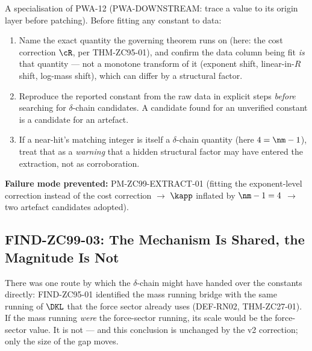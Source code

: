 \documentclass[12pt, a4paper]{article}
\begin{document}
\begin{formalbox}[title={PWA-14 (NEW): Verify the Quantity-Identity Before
  Extracting a Constant}]
A specialisation of PWA-12 (PWA-DOWNSTREAM: trace a value to its origin layer
before patching). Before fitting any constant to data:
\begin{enumerate}[leftmargin=1.8em, noitemsep]
  \item Name the exact quantity the governing theorem runs on (here: the cost
    correction $\cR$, per THM-ZC95-01), and confirm the data column being fit
    \emph{is} that quantity --- not a monotone transform of it (exponent shift,
    linear-in-$R$ shift, log-mass shift), which can differ by a structural
    factor.
  \item Reproduce the reported constant from the raw data in explicit steps
    \emph{before} searching for $\delta$-chain candidates. A candidate found for
    an unverified constant is a candidate for an artefact.
  \item If a near-hit's matching integer is itself a $\delta$-chain quantity
    (here $4=\nm-1$), treat that as a \emph{warning} that a hidden structural
    factor may have entered the extraction, not as corroboration.
\end{enumerate}
\textbf{Failure mode prevented:} PM-ZC99-EXTRACT-01 (fitting the exponent-level
correction instead of the cost correction $\to$ $\kapp$ inflated by $\nm-1=4$
$\to$ two artefact candidates adopted).
\end{formalbox}

\subsection{FIND-ZC99-03: The Mechanism Is Shared, the Magnitude Is Not}
\label{sec:mechanism-zc99}

There was one route by which the $\delta$-chain might have handed over the
constants directly: FIND-ZC95-01 identified the mass running bridge with the
same running of $\DKL$ that the force sector already uses (DEF-RN02,
THM-ZC27-01). If the mass running \emph{were} the force-sector running, its
scale would be the force-sector value. It is not --- and this conclusion is
unchanged by the v2 correction; only the size of the gap moves.
\end{document}
